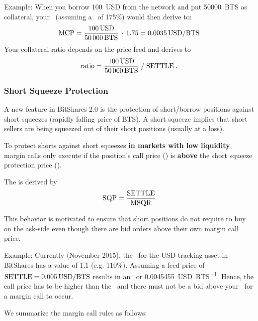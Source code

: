 Example:
When you borrow \SI{100}{USD} from the network and put \SI{50000}{BTS} as
collateral, your \MCP\ (assuming a \MCR\ of 175\%) would then derive to:
\begin{align*}
 \text{MCP} = \frac{\SI{100}{USD}}{\SI{50000}{BTS}}\,\cdot\, 1.75 = \SI{0.0035}{USD\per BTS}
\end{align*}
Your collateral ratio depends on the price feed and derives to
\begin{align*}
 \text{ratio} = \frac{\SI{100}{USD}}{\SI{50000}{BTS}} \;/\; \text{SETTLE}\;.
\end{align*}

\subsubsection{Short Squeeze Protection}

A new feature in BitShares 2.0 is the protection of short/borrow positions
against short squeezes (rapidly falling price of BTS). A short squeeze implies
that short sellers are being squeezed out of their short positions (usually at
a loss). 

To protect shorts against short squeezes \textbf{in markets with low
liquidity}, margin calls only execute if the position's call price (\MCP) is
\textbf{above} the short squeeze protection price (\SQP).

The \SQP is derived by
\begin{align}
 \text{SQP} = \frac{\text{SETTLE}}{\text{MSQR}}
\end{align}

This behavior is motivated to ensure that short positions do not require to buy
on the ask-side even though there are bid orders above their own margin call
price.

Example:
Currently (November 2015), the \MSQR\ for the USD tracking asset in BitShares
has a value of \num{1.1} (e.g. 110\%). Assuming a feed price of $\text{SETTLE} =
\SI{0.005}{USD\per BTS}$ results in an \SQP\ or \SI{0.0045455}{USD\per BTS}.
Hence, the call price has to be higher than the \SQP\ and there must not be a
bid above your \MCP\ for a margin call to occur.

We summarize the margin call rules as follows:
\begin{center}
\noindent{}
\end{center}

